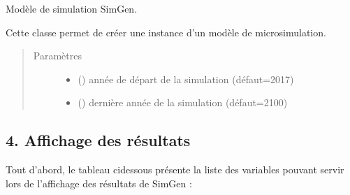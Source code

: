 \documentclass[letterpaper,10pt,french]{sphinxmanual}
\begin{document}
\begin{fulllineitems}
\label{\detokenize{utilisation:id3}}
Modèle de simulation SimGen.

Cette classe permet de créer une instance d’un modèle de microsimulation.
\begin{quote}\begin{description}
\item[{Paramètres}] \leavevmode\begin{itemize}
\item {} 
 () \textendash{} année de départ de la simulation (défaut=2017)

\item {} 
 () \textendash{} dernière année de la simulation (défaut=2100)

\end{itemize}

\end{description}\end{quote}

\end{fulllineitems}


\begin{DUlineblock}{0em}
\item[] 
\end{DUlineblock}


\subsection{4. Affichage des résultats}
\label{\detokenize{utilisation:affichage-des-resultats}}
Tout d’abord, le tableau ci\sphinxhyphen{}dessous présente la liste des variables pouvant servir lors de l’affichage des résultats de SimGen :
\end{document}
